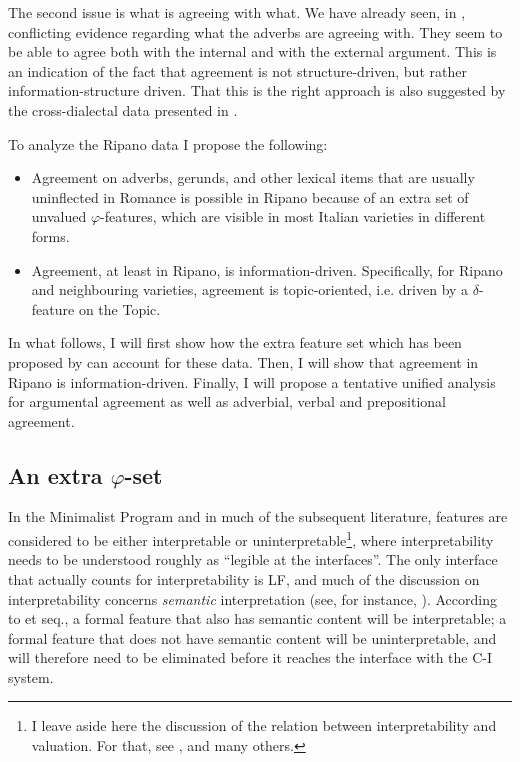 \documentclass[output=paper
,modfonts
,nonflat]{langsci/langscibook}
\begin{document}
The second issue is what is agreeing with what. We have already seen, in , conflicting evidence regarding what the adverbs are agreeing with. They seem to be able to agree both with the internal and with the external argument. This is an indication of the fact that agreement is not structure-driven, but rather information-structure driven. That this is the right approach is also suggested by the cross-dialectal data presented in .

To analyze the Ripano data I propose the following:
\begin{itemize}
	\item
		Agreement on adverbs, gerunds, and other lexical items that are usually uninflected in Romance is possible in Ripano because of an extra set of unvalued $\varphi $-features, which are visible in most Italian varieties in different forms.
	\item 
		Agreement, at least in Ripano, is information-driven. Specifically, for Ripano and neighbouring varieties, agreement is topic-oriented, i.e. driven by a $\delta $-feature on the Topic. 
\end{itemize}
In what follows, I will first show how the extra feature set which has been proposed by \citet{D`Alessandro2017} can account for these data. Then, I will show that agreement in Ripano is information-driven. Finally, I will propose a tentative unified analysis for argumental agreement as well as adverbial, verbal and prepositional agreement.

\subsection{An extra \texorpdfstring{$\varphi$}{\textphi}-set} \label{sec-dalessandro:3.2}
In the Minimalist Program \citep{Chomsky1995} and in much of the subsequent literature, features are considered to be either interpretable or uninterpretable\footnote{
I leave aside here the discussion of the relation between interpretability and valuation. For that, see \citet{Pesetsky_Torrego2007}, \citet{Zeijlstra2008} and many others.}, where interpretability needs to be understood roughly as “legible at the interfaces”. The only interface that actually counts for interpretability is LF, and much of the discussion on interpretability concerns \textit{semantic} interpretation (see, for instance, \citealt{Zeijlstra2008}). According to \citet{Zeijlstra2008} et seq., a formal feature that also has semantic content will be interpretable; a formal feature that does not have semantic content will be uninterpretable, and will therefore need to be eliminated before it reaches the interface with the C-I system.
\end{document}
